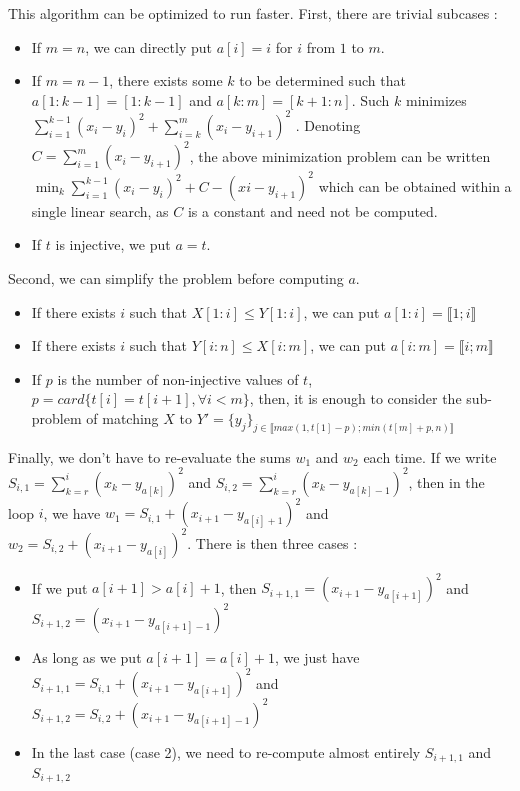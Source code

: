 \documentclass[a4paper,12pt]{article}
\begin{document}
This algorithm can be optimized to run faster. First, there are trivial subcases :
\begin{itemize}
\item If $m=n$, we can directly put $a[i]=i$ for $i$ from $1$ to $m$.

\item If $m=n-1$, there exists some $k$ to be determined such that $a[1: k − 1] = [1: k − 1]$
and $a[k: m] = [k + 1: n]$. Such $k$ minimizes $\sum_{i=1}^{k-1} (x_i-y_i)^2 + \sum_{i=k}^{m} (x_i-y_{i+1})^2 $ . Denoting $C = \sum_{i=1}^m (x_i - y_{i+1})^2$, the above minimization problem can be written $\min_k \sum_{i=1}^{k-1} (x_i-y_i)^2 + C - (x i - y_{i+1})^2$ which can be obtained within a single linear search, as $C$ is a constant and need not be computed.

\item If $t$ is injective, we put $a=t$.
\end{itemize}

Second, we can simplify the problem before computing $a$.
\begin{itemize}
\item If there exists $i$ such that $X[1:i] \leqslant Y[1:i]$, we can put $a[1:i] = \llbracket 1;i \rrbracket$
\item If there exists $i$ such that $Y[i:n] \leqslant X[i:m]$, we can put $a[i:m] = \llbracket i;m \rrbracket$
\item If $p$ is the number of non-injective values of $t$, $p=card\{t[i] = t[i + 1], \forall i < m\}$, then, it is enough to consider the sub-problem of matching $X$ to $Y' = \{y_j\}_{j \in \llbracket max(1,t[1]−p) ; min(t[m]+p,n) \rrbracket}$
\end{itemize}

Finally, we don't have to re-evaluate the sums $w_1$ and $w_2$ each time. If we write $S_{i,1} = \sum_{k=r}^{i} (x_k - y_{a[k]})^2$ and $S_{i,2} = \sum_{k=r}^{i} (x_k - y_{a[k]-1})^2$, then in the loop $i$, we have $w_1 = S_{i,1} + (x_{i+1} - y_{a[i]+1})^2$ and $w_2 = S_{i,2} + (x_{i+1} - y_{a[i]})^2$. There is then three cases :
\begin{itemize}
\item If we put $a[i+1]>a[i]+1$, then $S_{i+1,1}=(x_{i+1}-y_{a[i+1]})^2$ and $S_{i+1,2} = (x_{i+1}-y_{a[i+1]-1})^2$
\item As long as we put $a[i+1] = a[i]+1$, we just have $S_{i+1,1} = S_{i,1}+(x_{i+1}-y_{a[i+1]})^2$ and $S_{i+1,2} = S_{i,2}+(x_{i+1}-y_{a[i+1]-1})^2$
\item In the last case (case 2), we need to re-compute almost entirely $S_{i+1,1}$ and $S_{i+1,2}$
\end{itemize}
\end{document}
